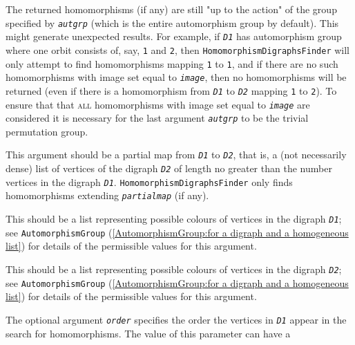 \documentclass[a4paper,11pt]{report}
\begin{document}
{{{\begin{description}
 The returned homomorphisms (if any) are still "up to the action" of the group
specified by \mbox{\texttt{\mdseries\slshape aut{\textunderscore}grp}} (which is the entire automorphism group by default). This might generate
unexpected results. For example, if \mbox{\texttt{\mdseries\slshape D1}} has automorphism group where one orbit consists of, say, \texttt{1} and \texttt{2}, then \texttt{HomomorphismDigraphsFinder} will only attempt to find homomorphisms mapping \texttt{1} to \texttt{1}, and if there are no such homomorphisms with image set equal to \mbox{\texttt{\mdseries\slshape image}}, then no homomorphisms will be returned (even if there is a homomorphism from \mbox{\texttt{\mdseries\slshape D1}} to \mbox{\texttt{\mdseries\slshape D2}} mapping \texttt{1} to \texttt{2}). To ensure that that \textsc{all} homomorphisms with image set equal to \mbox{\texttt{\mdseries\slshape image}} are considered it is necessary for the last argument \mbox{\texttt{\mdseries\slshape aut{\textunderscore}grp}} to be the trivial permutation group. 
\item[{\mbox{\texttt{\mdseries\slshape partial{\textunderscore}map}}}]  This argument should be a partial map from \mbox{\texttt{\mdseries\slshape D1}} to \mbox{\texttt{\mdseries\slshape D2}}, that is, a (not necessarily dense) list of vertices of the digraph \mbox{\texttt{\mdseries\slshape D2}} of length no greater than the number vertices in the digraph \mbox{\texttt{\mdseries\slshape D1}}. \texttt{HomomorphismDigraphsFinder} only finds homomorphisms extending \mbox{\texttt{\mdseries\slshape partial{\textunderscore}map}} (if any). 
\item[{\mbox{\texttt{\mdseries\slshape colors1}}}]  This should be a list representing possible colours of vertices in the digraph \mbox{\texttt{\mdseries\slshape D1}}; see \texttt{AutomorphismGroup} (\ref{AutomorphismGroup:for a digraph and a homogeneous list}) for details of the permissible values for this argument. 
\item[{\mbox{\texttt{\mdseries\slshape colors2}}}]  This should be a list representing possible colours of vertices in the digraph \mbox{\texttt{\mdseries\slshape D2}}; see \texttt{AutomorphismGroup} (\ref{AutomorphismGroup:for a digraph and a homogeneous list}) for details of the permissible values for this argument. 
\item[{\mbox{\texttt{\mdseries\slshape order}}}]  The optional argument \mbox{\texttt{\mdseries\slshape order}} specifies the order the vertices in \mbox{\texttt{\mdseries\slshape D1}} appear in the search for homomorphisms. The value of this parameter can have a

\end{description}}}}
\end{document}

